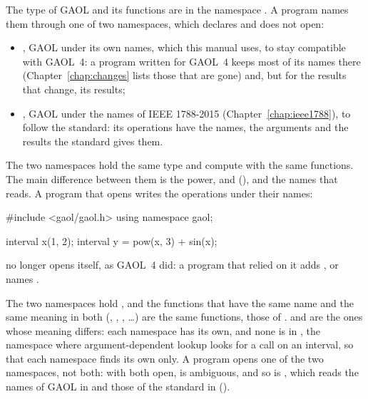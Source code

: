 The type  of GAOL and its functions are in the namespace
. A program names them through one of two namespaces, which
 declares and does not open:\newinvfive

\begin{itemize}
\item[$\bullet$] \textbf{}, GAOL under its own names, which this
  manual uses, to stay compatible with GAOL~4: a program written for GAOL~4
  keeps most of its names there (Chapter~\ref{chap:changes} lists those that
  are gone) and, but for the results that change, its results;
\item[$\bullet$] \textbf{}, GAOL under the names of IEEE
  1788-2015 (Chapter~\ref{chap:ieee1788}), to follow the standard: its
  operations have the names, the arguments and the results the standard gives
  them.
\end{itemize}

\noindent
The two namespaces hold the same type and compute with the same functions.
The main difference between them is the power,  and 
(), and the names that  reads.
A program that opens  writes the operations under their names:

\begin{example}
#include <gaol/gaol.h>
using namespace gaol;

interval x(1, 2);
interval y = pow(x, 3) + sin(x);
\end{example}

\noindent
{} no longer opens  itself, as GAOL~4 did: a
program that relied on it adds , or names
.\newinvfive

\medskip
The two namespaces hold , and the functions that have the same
name and the same meaning in both (, , ,
\ldots) are the same functions, those of .
 and  are the ones whose meaning differs: each
namespace has its own, and none is in , the namespace where
argument-dependent lookup looks for a call  on an interval, so
that each namespace finds its own only. A program opens one of the two
namespaces, not both: with both open,  is ambiguous, and so is
, which reads the names of GAOL in  and
those of the standard in  ().

